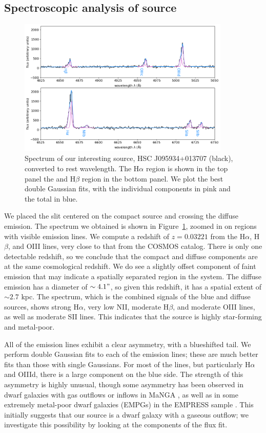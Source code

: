 \subsection{Spectroscopic analysis of source}

\begin{figure}
    \centering
    \includegraphics[width=0.9\textwidth]{spectra}
    \caption{Spectrum of our interesting source, HSC J095934+013707 (black), converted to rest wavelength. The H$\alpha$ region is shown in the top panel the and H$\beta$ region in the bottom panel. We plot the best double Gaussian fits, with the individual components in pink and the total in blue.}
    \label{fig:spectra}
\end{figure}

We placed the slit centered on the compact source and crossing the diffuse emission. 
The spectrum we obtained is shown in Figure~\ref{fig:spectra}, zoomed in on regions with visible emission lines.
We compute a redshift of $z=0.03221$ from the H$\alpha$, H$\beta$, and OIII lines, very close to that from the COSMOS catalog.
There is only one detectable redshift, so we conclude that the compact and diffuse components are at the same cosmological redshift.
We do see a slightly offset component of faint emission that may indicate a spatially separated region in the system.
The diffuse emission has a diameter of $\sim4.1"$, so given this redshift, it has a spatial extent of $\sim2.7$ kpc.
The spectrum, which is the combined signals of the blue and diffuse sources, shows strong H$\alpha$, very low NII, moderate H$\beta$, and moderate OIII lines, as well as moderate SII lines. 
This indicates that the source is highly star-forming and metal-poor.

All of the emission lines exhibit a clear asymmetry, with a blueshifted tail.
We perform double Gaussian fits to each of the emission lines; these are much better fits than those with single Gaussians.
For most of the lines, but particularly H$\alpha$ and OIIId, there is a large component on the blue side.
The strength of this asymmetry is highly unusual, though some asymmetry has been observed in dwarf galaxies with gas outflows or inflows in MaNGA \citep{Wylezalek2020, Avery2021}, as well as in some extremely metal-poor dwarf galaxies (EMPGs) in the EMPRESS sample \citep{Kojima2019}.
This initially suggests that our source is a dwarf galaxy with a gaseous outflow; we investigate this possibility by looking at the components of the flux fit.

